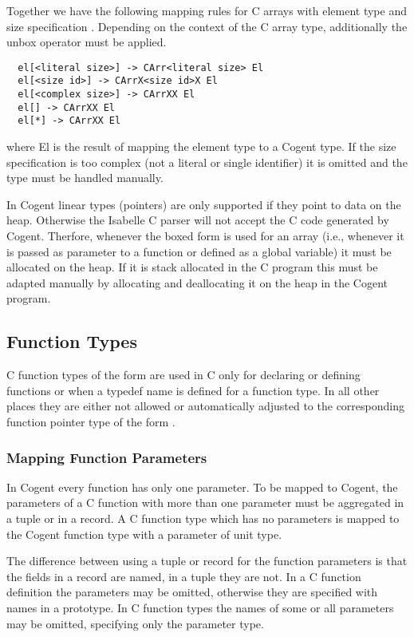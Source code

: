 Together we have the following mapping rules for C arrays with element type  and size 
specification . Depending on the context of the C array type, additionally the unbox operator must be applied.
\begin{verbatim}
  el[<literal size>] -> CArr<literal size> El
  el[<size id>] -> CArrX<size id>X El
  el[<complex size>] -> CArrXX El
  el[] -> CArrXX El
  el[*] -> CArrXX El
\end{verbatim}
where El is the result of mapping the element type  to a Cogent type. If the size specification
is too complex (not a literal or single identifier) it is omitted and the type must be handled manually.

In Cogent linear types (pointers) are only supported if they point to data on the heap. Otherwise the Isabelle 
C parser will not accept the C code generated by Cogent. Therfore, whenever the boxed form is used for an array
(i.e., whenever it is passed as parameter to a function or defined as a global variable) it must be allocated
on the heap. If it is stack allocated in the C program this must be adapted manually by allocating and deallocating
it on the heap in the Cogent program.

\subsection{Function Types}
\label{design-types-function}

C function types of the form  are used in C only for declaring or defining functions or
when a typedef name is defined for a function type. In all other
places they are either not allowed or automatically adjusted to the corresponding function pointer type
of the form . 

\subsubsection{Mapping Function Parameters}

In Cogent every function
has only one parameter. To be mapped to Cogent, the parameters of a C function with more than one parameter must
be aggregated in a tuple or in a record. A C function type  which has no parameters is mapped
to the Cogent function type  with a parameter of unit type.

The difference between using a tuple or record for the function parameters is that the fields in a 
record are named, in a tuple they are not. In 
a C function definition the parameters may be omitted, otherwise they are specified with names in a prototype.
In C function types the names of some or all parameters may be omitted, specifying only the parameter type.

